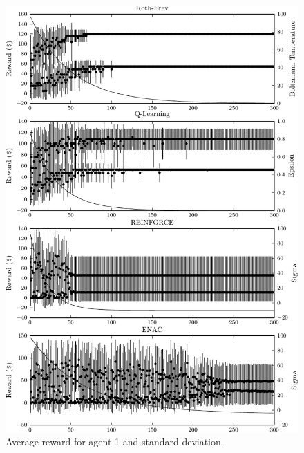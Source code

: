 \begin{figure}
  \centering
  \includegraphics{figures/fig5_2_reward_a1}
  \caption{Average reward for agent 1 and standard deviation.}
  \label{fig:5_2_reward_a1}
\end{figure}
